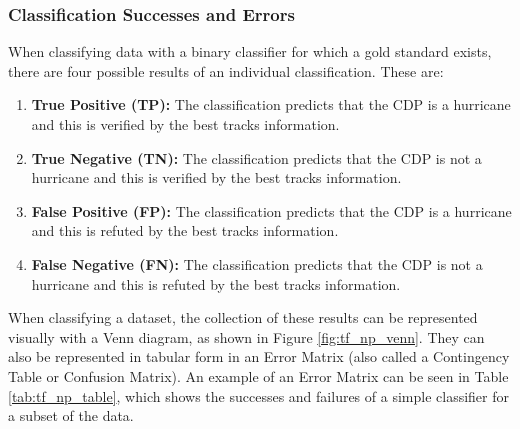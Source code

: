 \documentclass[pdftex,12pt,a4paper]{report}
\begin{document}
\subsubsection{Classification Successes and Errors}


When classifying data with a binary classifier for which a gold standard exists, there are four
possible results of an individual classification. These are:

\begin{enumerate}
    \item \textbf{True Positive (TP):} The classification predicts that the CDP is a hurricane and
        this is verified by the best tracks information.
    \item \textbf{True Negative (TN):} The classification predicts that the CDP is not a hurricane
        and this is verified by the best tracks information.
    \item \textbf{False Positive (FP):} The classification predicts that the CDP is a hurricane and
        this is refuted by the best tracks information.
    \item \textbf{False Negative (FN):} The classification predicts that the CDP is not a hurricane
        and this is refuted by the best tracks information.
\end{enumerate}

When classifying a dataset, the collection of these results can be represented visually with a Venn
diagram, as shown in Figure \ref{fig:tf_np_venn}. They can also be represented in tabular form in an
Error Matrix (also called a Contingency Table or Confusion Matrix). An example of an Error Matrix
can be seen in Table \ref{tab:tf_np_table}, which shows the successes and failures of a simple
classifier for a subset of the data.
\end{document}
